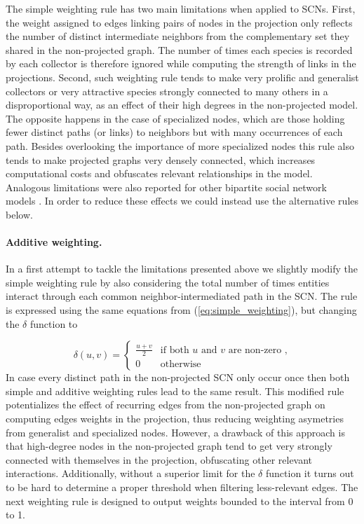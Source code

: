 The simple weighting rule has two main limitations when applied to SCNs.
First, the weight assigned to edges linking pairs of nodes in the projection only reflects the number of distinct intermediate neighbors from the complementary set they shared in the non-projected graph. The number of times each species is recorded by each collector is therefore ignored while computing the strength of links in the projections.
Second, such weighting rule tends to make very prolific and generalist collectors or very attractive species strongly connected to many others in a disproportional way, as an effect of their high degrees in the non-projected model. The opposite happens in the case of specialized nodes, which are those holding fewer distinct paths (or links) to neighbors but with many occurrences of each path. Besides overlooking the importance of more specialized nodes this rule also tends to make projected graphs very densely connected, which increases computational costs and obfuscates relevant relationships in the model. Analogous limitations were also reported for other bipartite social network models \cite{Lambiotte2005}.
In order to reduce these effects we could instead use the alternative rules below.

\paragraph*{Additive weighting.}
In a first attempt to tackle the limitations presented above we slightly modify the simple weighting rule by also considering the total number of times entities interact through each common neighbor-intermediated path in the SCN. The rule is expressed using the same equations from (\ref{eq:simple_weighting}), but changing the $\delta$ function to
 
$$\delta(u,v) = 
\begin{cases}
\frac{u+v}{2} &  \mbox{if both } u \mbox{ and } v \mbox{ are non-zero ,}\\
0 & \mbox{otherwise}
\end{cases}
$$
In case every distinct path in the non-projected SCN only occur once then both simple and additive weighting rules lead to the same result. 
This modified rule potentializes the effect of recurring edges from the non-projected graph on computing edges weights in the projection, thus reducing weighting asymetries from generalist and specialized nodes.
However, a drawback of this approach is that high-degree nodes in the non-projected graph tend to get very strongly connected with themselves in the projection, obfuscating other relevant interactions.
Additionally, without a superior limit for the $\delta$ function it turns out to be hard to determine a proper threshold when filtering less-relevant edges. The next weighting rule is designed to output weights bounded to the interval from 0 to 1.

